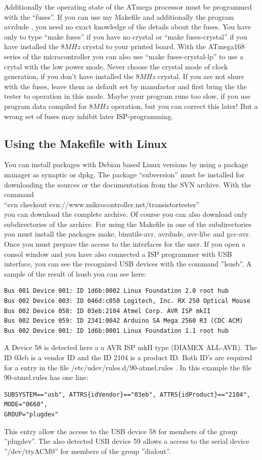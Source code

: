 Additionally the operating state of the
ATmega processor must be programmed with the ``fuses''.
If you can use my Makefile and additionally the program avrdude \cite{avrdude}, you need no exact
knowledge of the details about the fuses. You have only to type ``make fuses'' if you
have no crystal or ``make fuses-crystal'' if you have installed the \(8MHz\) crystal to your printed board.
With the ATmega168 series of the microcontroller you can also use ``make fuses-crystal-lp'' to use
a crytal with the low power mode.
Never choose the crystal mode of clock generation, if you don't have installed
the \(8MHz\) crystal. If you are not shure with the fuses, leave them as default
set by manufactor and first bring the the tester to operation in this mode.
Maybe your program runs too slow, if you use program data compiled for
\(8MHz\) operation, but you can correct this later! But a wrong set of fuses may inhibit
later ISP-programming.

\subsection{Using the Makefile with Linux}
You can install packages with Debian based Linux versions by using a package manager as synaptic or dpkg.
The package ``subversion'' must be installed for downloading the sources or the documentation from the SVN archive.
With the command \\
``svn checkout svn://www.mikrocontroller.net/transistortester'' \\
you can download the complete archive.
Of course you can also download only subdirectories of the archive.
For using the Makefile in one of the subdirectories you must install the packages
make, binutils-avr, avrdude, avr-libc and gcc-avr.
Once you must prepare the access to the interfaces for the user.
If you open a consol window and you have also connected a ISP programmer with USB interface,
you can see the recognized USB devices with the command ''lsusb''.
A sample of the result of lsusb you can see here:
\begin{verbatim}
Bus 001 Device 001: ID 1d6b:0002 Linux Foundation 2.0 root hub
Bus 002 Device 003: ID 046d:c050 Logitech, Inc. RX 250 Optical Mouse
Bus 002 Device 058: ID 03eb:2104 Atmel Corp. AVR ISP mkII
Bus 002 Device 059: ID 2341:0042 Arduino SA Mega 2560 R3 (CDC ACM)
Bus 002 Device 001: ID 1d6b:0001 Linux Foundation 1.1 root hub
\end{verbatim}
A Device 58 is detected here a a AVR ISP mkII type (DIAMEX ALL-AVR).
The ID 03eb is a vendor ID and the ID 2104 is a product ID.
Both ID's are required for a entry in the file /etc/udev/rules.d/90-atmel.rules .
In this example the file 90-atmel.rules has one line:
\begin{verbatim}
SUBSYSTEM=="usb", ATTRS{idVendor}=="03eb", ATTRS{idProduct}=="2104", MODE="0660",
GROUP="plugdev"
\end{verbatim}
This entry allow the access to the USB device 58 for members of the group ''plugdev''.
The also detected USB device 59 allows a access to the serial device ''/dev/ttyACM0'' for
members of the group ''dialout''.

